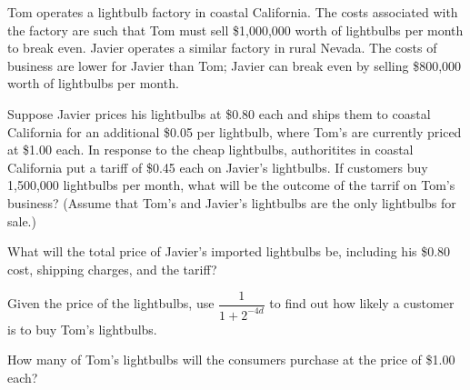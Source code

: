 \documentclass{ximera}
\begin{document}
\begin{question}
Tom operates a lightbulb factory in coastal California. The costs associated with the factory are such that Tom must sell \$1,000,000 worth of lightbulbs per month to break even. Javier operates a similar factory in rural Nevada. The costs of business are lower for Javier than Tom; Javier can break even by selling \$800,000 worth of lightbulbs per month.

Suppose Javier prices his lightbulbs at \$0.80 each and ships them to coastal California for an additional \$0.05 per lightbulb, where Tom's are currently priced at \$1.00 each. In response to the cheap lightbulbs, authoritites in coastal California put a tariff of \$0.45 each on Javier's lightbulbs. If customers buy 1,500,000 lightbulbs per month, what will be the outcome of the tarrif on Tom's business? (Assume that Tom's and Javier's lightbulbs are the only lightbulbs for sale.)

\begin{solution}
\begin{multiple-choice}
    \end{multiple-choice}
\begin{hint}
What will the total price of Javier's imported lightbulbs be, including his \$0.80 cost, shipping charges, and the tariff?
\end{hint}
\begin{hint}
Given the price of the lightbulbs, use $\dfrac{1}{1+2^{-4d}}$ to find out how likely a customer is to buy Tom's lightbulbs.
\end{hint}
\begin{hint}
How many of Tom's lightbulbs will the consumers purchase at the price of \$1.00 each?
\end{hint}
\end{solution}
\end{question}
\end{document}
